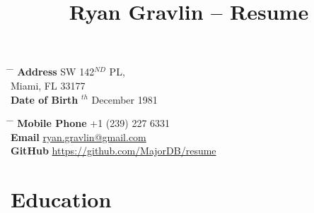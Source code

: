 \documentclass[10pt]{article} %
\begin{document}

\title{Ryan Gravlin -- Resume} %


\parbox{0.5\textwidth}{ %
\begin{tabbing} %
\hspace{3cm} \= \hspace{4cm} \= \kill %
{\bf Address}  SW 142$^{ND}$ PL,\\ %
\> Miami, FL 33177 \\ %
{\bf Date of Birth} $^{th}$ December 1981 \\ %
\end{tabbing}}
\hfill %
\parbox{0.5\textwidth}{ %
\begin{tabbing} %
\hspace{3cm} \= \hspace{4cm} \= \kill %
{\bf Mobile Phone} \> +1 (239) 227 6331 \\ %
{\bf Email} \> \href{mailto:ryan.gravlin@gmail.com}{ryan.gravlin@gmail.com} \\ %
{\bf GitHub} \> \href{https://github.com/MajorDB/resume}{https://github.com/MajorDB/resume} \\ %
\end{tabbing}}

\section{Education}


\end{document}

